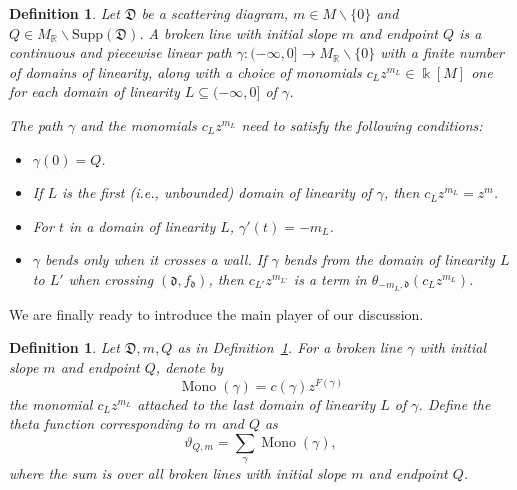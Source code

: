 \documentclass[11pt]{amsart}
\newtheorem{defn}[theorem]{Definition}
\theoremstyle{remark}
\numberwithin{equation}{section}
\newcommand{\RR}{\mathbb{R}}
\newcommand{\dd}{\mathfrak{d}}
\newcommand{\DD}{\mathfrak{D}}
\newcommand{\Mono}{\operatorname{Mono}}
\begin{document}
\begin{defn} 
  \label{brokendef}
  Let $\DD$ be a scattering diagram, $m \in M \backslash \{0\}$ and $Q \in
  M_{\RR} \backslash \text{Supp}(\DD)$.  A \emph{broken line} with initial slope
  $m$ and endpoint $Q$ is a continuous and piecewise linear path $\gamma : ( -
  \infty , 0] \rightarrow M_{\mathbb{R}} \backslash \{ 0\} $ with a finite
  number of domains of linearity, along with a choice of monomials $c_L z^{m_L}
  \in \Bbbk[M]$ one for each domain of linearity $L \subseteq ( - \infty, 0]$ of
  $\gamma$. 
  
  The path $\gamma$ and the monomials $c_L z^{m_L}$ need to satisfy the
  following conditions:
  \begin{itemize}
    \item 
      $\gamma(0) = Q$.
    
    \item 
      If $L$ is the first (i.e., unbounded) domain of linearity of $\gamma$,
      then $c_L z^{m_L} = z^{m}$.

    \item 
      For $t$ in a domain of linearity $L$, $\gamma'(t) = -m_L$.

    \item 
      $\gamma$ bends only when it crosses a wall. If $\gamma$ bends from the
      domain of linearity $L$ to $ L'$ when crossing $(\dd, f_{\dd})$, then
      $c_{L'}z^{m_{L'}}$ is a term in $\theta_{-m_L, \dd} (c_L z^{m_L})$.  
  \end{itemize}
\end{defn}

We are finally ready to introduce the main player of our discussion.
\begin{defn}
  Let $\DD, m, Q$ as in Definition~\ref{brokendef}. For a broken line $\gamma$
  with initial slope $m$ and endpoint $Q$, denote by 
  \[
    \Mono (\gamma) = c(\gamma)z^{F(\gamma)}
  \] 
  the monomial $c_L z^{m_L}$ attached to the last domain of linearity $L$ of
  $\gamma$. Define the \emph{theta function} corresponding to $m$ and $Q$ as
  \[ 
    \vartheta_{Q, m} = \sum_{\gamma} \Mono (\gamma), 
  \] 
  where the sum is over all broken lines with initial slope $m$ and endpoint
  $Q$.
\end{defn}
\end{document}
